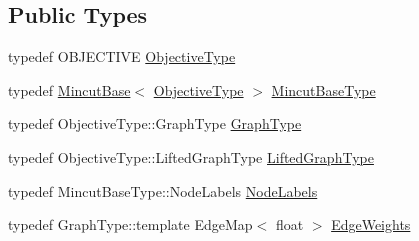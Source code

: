 \subsection*{Public Types}
\begin{DoxyCompactItemize}
\item 
typedef O\+B\+J\+E\+C\+T\+I\+V\+E \hyperlink{classnifty_1_1graph_1_1optimization_1_1mincut_1_1RandomProposalGenerator_a22d8486d3e63bd7770c0c8f91b1a7886}{Objective\+Type}
\item 
typedef \hyperlink{classnifty_1_1graph_1_1optimization_1_1mincut_1_1MincutBase}{Mincut\+Base}$<$ \hyperlink{classnifty_1_1graph_1_1optimization_1_1mincut_1_1RandomProposalGenerator_a22d8486d3e63bd7770c0c8f91b1a7886}{Objective\+Type} $>$ \hyperlink{classnifty_1_1graph_1_1optimization_1_1mincut_1_1RandomProposalGenerator_a1230b06f0f8b6da67e09c3ab3ed5db9b}{Mincut\+Base\+Type}
\item 
typedef Objective\+Type\+::\+Graph\+Type \hyperlink{classnifty_1_1graph_1_1optimization_1_1mincut_1_1RandomProposalGenerator_a17d874d30ea12ad0c598970aa87801d1}{Graph\+Type}
\item 
typedef Objective\+Type\+::\+Lifted\+Graph\+Type \hyperlink{classnifty_1_1graph_1_1optimization_1_1mincut_1_1RandomProposalGenerator_a14ba35945632d24fc46adda159546763}{Lifted\+Graph\+Type}
\item 
typedef Mincut\+Base\+Type\+::\+Node\+Labels \hyperlink{classnifty_1_1graph_1_1optimization_1_1mincut_1_1RandomProposalGenerator_a5efdbc8fab540e65e900601cba50912c}{Node\+Labels}
\item 
typedef Graph\+Type\+::template Edge\+Map$<$ float $>$ \hyperlink{classnifty_1_1graph_1_1optimization_1_1mincut_1_1RandomProposalGenerator_a82e5878a1c598f7605e18f969271408d}{Edge\+Weights}
\end{DoxyCompactItemize}
